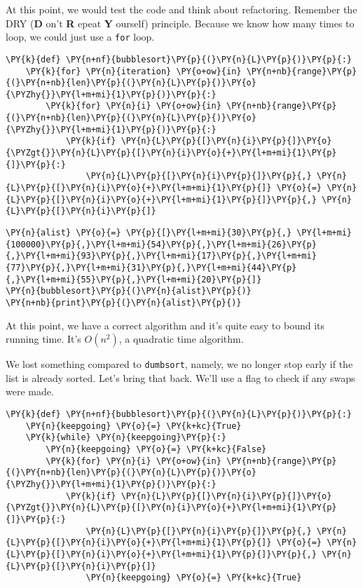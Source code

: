At this point, we would test the code and think about refactoring.  Remember the DRY (\textbf{D} on't \textbf{R} epeat \textbf{Y} ourself) principle.  Because we know how many times to loop, we could just use a \texttt{for} loop.  

\begin{Verbatim}[commandchars=\\\{\}]
\PY{k}{def} \PY{n+nf}{bubblesort}\PY{p}{(}\PY{n}{L}\PY{p}{)}\PY{p}{:}
    \PY{k}{for} \PY{n}{iteration} \PY{o+ow}{in} \PY{n+nb}{range}\PY{p}{(}\PY{n+nb}{len}\PY{p}{(}\PY{n}{L}\PY{p}{)}\PY{o}{\PYZhy{}}\PY{l+m+mi}{1}\PY{p}{)}\PY{p}{:}
        \PY{k}{for} \PY{n}{i} \PY{o+ow}{in} \PY{n+nb}{range}\PY{p}{(}\PY{n+nb}{len}\PY{p}{(}\PY{n}{L}\PY{p}{)}\PY{o}{\PYZhy{}}\PY{l+m+mi}{1}\PY{p}{)}\PY{p}{:}
            \PY{k}{if} \PY{n}{L}\PY{p}{[}\PY{n}{i}\PY{p}{]}\PY{o}{\PYZgt{}}\PY{n}{L}\PY{p}{[}\PY{n}{i}\PY{o}{+}\PY{l+m+mi}{1}\PY{p}{]}\PY{p}{:}
                \PY{n}{L}\PY{p}{[}\PY{n}{i}\PY{p}{]}\PY{p}{,} \PY{n}{L}\PY{p}{[}\PY{n}{i}\PY{o}{+}\PY{l+m+mi}{1}\PY{p}{]} \PY{o}{=} \PY{n}{L}\PY{p}{[}\PY{n}{i}\PY{o}{+}\PY{l+m+mi}{1}\PY{p}{]}\PY{p}{,} \PY{n}{L}\PY{p}{[}\PY{n}{i}\PY{p}{]}
\end{Verbatim}


\begin{Verbatim}[commandchars=\\\{\}]
\PY{n}{alist} \PY{o}{=} \PY{p}{[}\PY{l+m+mi}{30}\PY{p}{,} \PY{l+m+mi}{100000}\PY{p}{,}\PY{l+m+mi}{54}\PY{p}{,}\PY{l+m+mi}{26}\PY{p}{,}\PY{l+m+mi}{93}\PY{p}{,}\PY{l+m+mi}{17}\PY{p}{,}\PY{l+m+mi}{77}\PY{p}{,}\PY{l+m+mi}{31}\PY{p}{,}\PY{l+m+mi}{44}\PY{p}{,}\PY{l+m+mi}{55}\PY{p}{,}\PY{l+m+mi}{20}\PY{p}{]}
\PY{n}{bubblesort}\PY{p}{(}\PY{n}{alist}\PY{p}{)}
\PY{n+nb}{print}\PY{p}{(}\PY{n}{alist}\PY{p}{)}
\end{Verbatim}



At this point, we have a correct algorithm and it's quite easy to bound its running time.  It's $O(n^2)$, a quadratic time algorithm.


We lost something compared to \texttt{dumbsort}, namely, we no longer stop early if the list is already sorted.  Let's bring that back.  We'll use a flag to check if any swaps were made.  

\begin{Verbatim}[commandchars=\\\{\}]
\PY{k}{def} \PY{n+nf}{bubblesort}\PY{p}{(}\PY{n}{L}\PY{p}{)}\PY{p}{:}
    \PY{n}{keepgoing} \PY{o}{=} \PY{k+kc}{True}
    \PY{k}{while} \PY{n}{keepgoing}\PY{p}{:}
        \PY{n}{keepgoing} \PY{o}{=} \PY{k+kc}{False}
        \PY{k}{for} \PY{n}{i} \PY{o+ow}{in} \PY{n+nb}{range}\PY{p}{(}\PY{n+nb}{len}\PY{p}{(}\PY{n}{L}\PY{p}{)}\PY{o}{\PYZhy{}}\PY{l+m+mi}{1}\PY{p}{)}\PY{p}{:}
            \PY{k}{if} \PY{n}{L}\PY{p}{[}\PY{n}{i}\PY{p}{]}\PY{o}{\PYZgt{}}\PY{n}{L}\PY{p}{[}\PY{n}{i}\PY{o}{+}\PY{l+m+mi}{1}\PY{p}{]}\PY{p}{:}
                \PY{n}{L}\PY{p}{[}\PY{n}{i}\PY{p}{]}\PY{p}{,} \PY{n}{L}\PY{p}{[}\PY{n}{i}\PY{o}{+}\PY{l+m+mi}{1}\PY{p}{]} \PY{o}{=} \PY{n}{L}\PY{p}{[}\PY{n}{i}\PY{o}{+}\PY{l+m+mi}{1}\PY{p}{]}\PY{p}{,} \PY{n}{L}\PY{p}{[}\PY{n}{i}\PY{p}{]}
                \PY{n}{keepgoing} \PY{o}{=} \PY{k+kc}{True}
\end{Verbatim}



